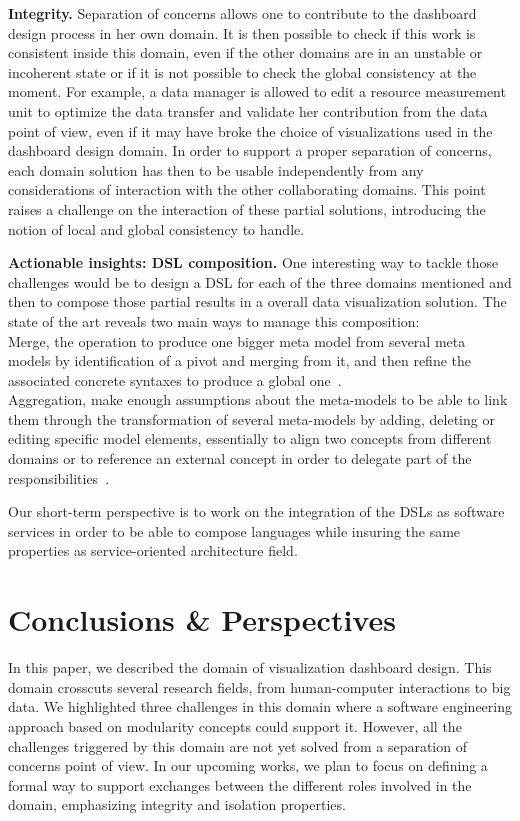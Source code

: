 \documentclass{sigplanconf}
\begin{document}
\textbf{Integrity.} Separation of concerns allows one to contribute to
the dashboard design process in her own domain. It is then possible to
check if this work is consistent inside this domain, even if the other
domains are in an unstable or incoherent state or if it is not
possible to check the global consistency at the moment. For example, a
data manager is allowed to edit a resource measurement unit to
optimize the data transfer and validate her contribution from the data
point of view, even if it may have broke the choice of visualizations
used in the dashboard design domain.  In order to support a proper
separation of concerns, each domain solution has then to be usable
independently from any considerations of interaction with the other
collaborating domains.  This point raises a challenge on the
interaction of these partial solutions, introducing the notion of
local and global consistency to handle.

\textbf{Actionable insights: DSL composition.}  One interesting way to
tackle those challenges would be to design a DSL for each of the three
domains mentioned and then to compose those partial results in a
overall data visualization solution.
The state of the art reveals two main ways to manage this composition:\\
 Merge, \ie the operation to produce one bigger meta model
from several meta models by identification of a pivot and merging from
it, and then refine the associated concrete syntaxes to produce a global 
one~\cite{kienzle13}.\\
 Aggregation, \ie make enough assumptions about the
meta-models to be able to link them through the transformation of
several meta-models by adding, deleting or editing specific model
elements, essentially to align two concepts from different domains or
to reference an external concept
in order to delegate part of the responsibilities~\cite{blouin14}.

Our short-term perspective is to work on the integration of the DSLs
as software services in order to be able to compose languages while
insuring the same properties as service-oriented architecture field.

\section{Conclusions \& Perspectives}
In this paper, we described the domain of visualization dashboard
design. This domain crosscuts several research fields, from
human-computer interactions to big data. We highlighted three
challenges in this domain where a software engineering approach based
on modularity concepts could support it. However, all the challenges
triggered by this domain are not yet solved from a separation of
concerns point of view. In our upcoming works, we plan to focus on
defining a formal way to support exchanges between the different roles
involved in the domain, emphasizing integrity and isolation
properties.
\end{document}
